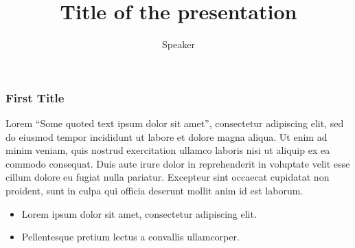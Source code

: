 \documentclass[t]{beamer}
\title{Title of the presentation}
\author[Speaker]{Speaker} %
\begin{document}
	\begin{frame}
		\titlepage
	\end{frame}


	\begin{frame}
		\frametitle{First Title}
	 	Lorem \enquote{Some quoted text ipsum dolor sit amet}, consectetur adipiscing elit, sed do eiusmod tempor incididunt ut labore et dolore magna aliqua. Ut enim ad minim veniam, quis nostrud exercitation ullamco laboris nisi ut aliquip ex ea commodo consequat. Duis aute irure dolor in reprehenderit in voluptate velit esse cillum dolore eu fugiat nulla pariatur. Excepteur sint occaecat cupidatat non proident, sunt in culpa qui officia deserunt mollit anim id est laborum.
	 	\begin{itemize}
	 		\item Lorem ipsum dolor sit amet, consectetur adipiscing elit.
	 		\item Pellentesque pretium lectus a convallis ullamcorper.
	 	\end{itemize}
	\end{frame}
\end{document}
